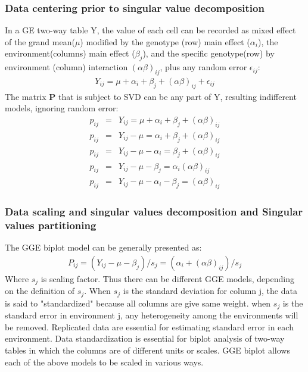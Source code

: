  \subsubsection{Data centering prior to singular value decomposition}
 In a GE two-way table Y, the value of each cell can be recorded as mixed effect of the grand mean($\mu$) modified by the genotype (row) main effect ($\alpha_i$), the environment(columns) main effect ($\beta_j$), and the specific genotype(row) by environment (column) interaction $(\alpha\beta)_{ij}$, plus any random error $\epsilon_{ij}$:
 \begin{eqnarray}
 Y_{ij}=\mu+\alpha_i +\beta_j+(\alpha\beta)_{ij}+\epsilon_{ij} 
 \end{eqnarray}
 The matrix \textbf{P} that is subject to SVD can be any part of Y, resulting indifferent models, ignoring random error:
  \begin{eqnarray}
 p_{ij} &=& Y_{ij}=\mu+\alpha_i +\beta_j+(\alpha\beta)_{ij} \\
 p_{ij}& =& Y_{ij}-\mu=\alpha_i +\beta_j+(\alpha\beta)_{ij} \\
 p_{ij} &=& Y_{ij}-\mu-\alpha_i =\beta_j+(\alpha\beta)_{ij}  \\
  p_{ij} &=& Y_{ij}-\mu-\beta_j=\alpha_i(\alpha\beta)_{ij}  \\
  p_{ij} &=& Y_{ij}-\mu-\alpha_i -\beta_j=(\alpha\beta)_{ij}  
  \end{eqnarray}
 
 \subsubsection{Data scaling and singular values decomposition and Singular values partitioning}
The GGE biplot model can be generally presented as:
\begin{eqnarray}
P_{ij}=(Y_{ij}-\mu-\beta_j)/s_j=(\alpha_i+(\alpha\beta)_{ij})/s_j
\end{eqnarray}
Where $s_j$ is scaling factor. Thus there can be different GGE models, depending on the definition of $s_j$. When $s_j$ is the standard deviation for column j, the data is said to "standardized" because all columns are give same weight. when $s_j$ is the standard error in environment j, any  heterogeneity among the environments will be removed. Replicated data are essential for estimating standard error in each environment. Data standardization is essential for biplot analysis of two-way tables in which the columns are of different units or scales. GGE biplot allows each of the above models to be scaled in various ways.

